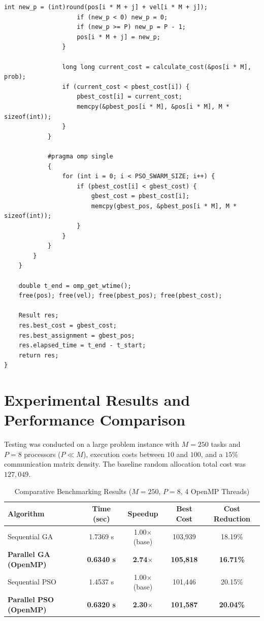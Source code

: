\documentclass[12pt]{article}
\begin{document}
\begin{lstlisting}[style=code]
                    int new_p = (int)round(pos[i * M + j] + vel[i * M + j]);
                    if (new_p < 0) new_p = 0;
                    if (new_p >= P) new_p = P - 1;
                    pos[i * M + j] = new_p;
                }

                long long current_cost = calculate_cost(&pos[i * M], prob);
                if (current_cost < pbest_cost[i]) {
                    pbest_cost[i] = current_cost;
                    memcpy(&pbest_pos[i * M], &pos[i * M], M * sizeof(int));
                }
            }

            #pragma omp single
            {
                for (int i = 0; i < PSO_SWARM_SIZE; i++) {
                    if (pbest_cost[i] < gbest_cost) {
                        gbest_cost = pbest_cost[i];
                        memcpy(gbest_pos, &pbest_pos[i * M], M * sizeof(int));
                    }
                }
            }
        }
    }

    double t_end = omp_get_wtime();
    free(pos); free(vel); free(pbest_pos); free(pbest_cost);

    Result res;
    res.best_cost = gbest_cost;
    res.best_assignment = gbest_pos;
    res.elapsed_time = t_end - t_start;
    return res;
}
\end{lstlisting}

\section{Experimental Results and Performance Comparison}
Testing was conducted on a large problem instance with $M = 250$ tasks and $P = 8$ processors ($P \ll M$), execution costs between $10$ and $100$, and a $15\%$ communication matrix density. The baseline random allocation total cost was $127,049$.

\begin{table}[H]
\centering
\caption{Comparative Benchmarking Results ($M = 250$, $P = 8$, 4 OpenMP Threads)}
\vspace{4pt}
\begin{tabular}{lcccc}
\toprule
\textbf{Algorithm} & \textbf{Time (sec)} & \textbf{Speedup} & \textbf{Best Cost} & \textbf{Cost Reduction} \\
\midrule
Sequential GA        & 1.7369 s & 1.00$\times$ (base) & 103,939 & 18.19\% \\
\textbf{Parallel GA (OpenMP)} & \textbf{0.6340 s} & \textbf{2.74$\times$} & \textbf{105,818} & \textbf{16.71\%} \\
\midrule
Sequential PSO       & 1.4537 s & 1.00$\times$ (base) & 101,446 & 20.15\% \\
\textbf{Parallel PSO (OpenMP)} & \textbf{0.6320 s} & \textbf{2.30$\times$} & \textbf{101,587} & \textbf{20.04\%} \\
\bottomrule
\end{tabular}
\end{table}
\end{document}
